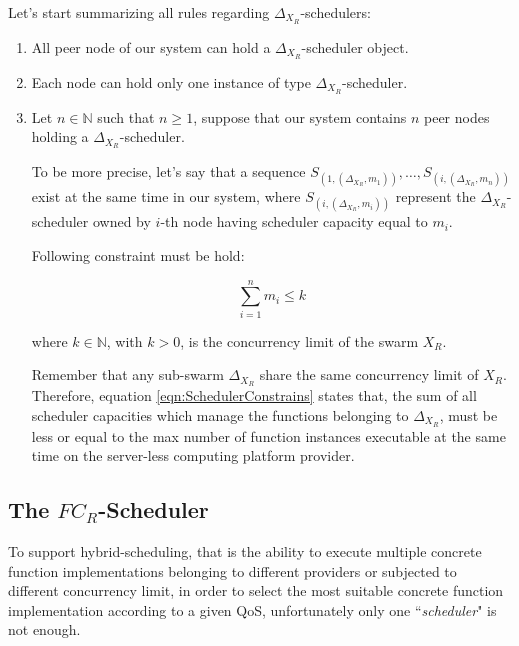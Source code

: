 \documentclass[10pt,a4paper]{article}
\theoremstyle{definition}
\begin{document}
Let's start summarizing all rules regarding $\Delta_{X_{R}}$-schedulers:

\begin{enumerate}

\item All peer node of our system can hold a $\Delta_{X_{R}}$-scheduler object.

\item Each node can hold only one instance of type $\Delta_{X_{R}}$-scheduler.

\item Let $n \in \mathbb{N}$ such that $n \geq 1$, suppose that our system contains $n$ peer nodes holding a $\Delta_{X_{R}}$-scheduler.

To be more precise, let's say that a sequence $S_{(1,(\Delta_{X_{R}},m_1))}, \ldots , S_{(i,(\Delta_{X_{R}},m_n))}$ exist at the same time in our system, where $S_{(i,(\Delta_{X_{R}},m_i))}$ represent the $\Delta_{X_{R}}$-scheduler owned by $i$-th node having scheduler capacity equal to $m_i$.

Following constraint must be hold:

\begin{equation}
\label{eqn:SchedulerConstrains}
\sum_{i=1}^{n} m_i \leq k
\end{equation}

where $k \in \mathbb{N}$, with $k > 0$, is the concurrency limit of the swarm $X_R$.

Remember that any sub-swarm $\Delta_{X_{R}}$ share the same concurrency limit of $X_R$. Therefore, equation \ref{eqn:SchedulerConstrains} states that, the sum of all scheduler capacities which manage the functions belonging to $\Delta_{X_{R}}$, must be less or equal to the max number of function instances executable at the same time on the server-less computing platform provider.

\end{enumerate}

\subsection{The $FC_R$-Scheduler}

To support hybrid-scheduling, that is the ability to execute multiple concrete function implementations belonging to different providers or subjected to different concurrency limit, in order to select the most suitable concrete function implementation according to a given QoS, unfortunately only one ``\textit{scheduler}" is not enough.
\end{document}
